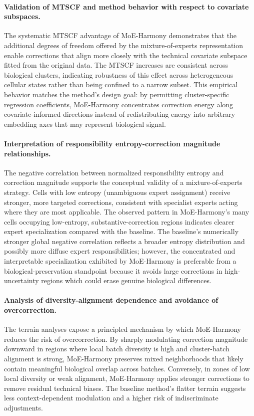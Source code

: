 \documentclass{article}
\begin{document}
\paragraph{Validation of MTSCF and method behavior with respect to covariate subspaces.} The systematic MTSCF advantage of MoE\hyp{}Harmony demonstrates that the additional degrees of freedom offered by the mixture-of-experts representation enable corrections that align more closely with the technical covariate subspace fitted from the original data. The MTSCF increases are consistent across biological clusters, indicating robustness of this effect across heterogeneous cellular states rather than being confined to a narrow subset. This empirical behavior matches the method's design goal: by permitting cluster-specific regression coefficients, MoE-Harmony concentrates correction energy along covariate-informed directions instead of redistributing energy into arbitrary embedding axes that may represent biological signal.

\paragraph{Interpretation of responsibility entropy-correction magnitude relationships.} The negative correlation between normalized responsibility entropy and correction magnitude supports the conceptual validity of a mixture-of-experts strategy. Cells with low entropy (unambiguous expert assignment) receive stronger, more targeted corrections, consistent with specialist experts acting where they are most applicable. The observed pattern in MoE-Harmony's many cells occupying low-entropy, substantive-correction regions indicates clearer expert specialization compared with the baseline. The baseline's numerically stronger global negative correlation reflects a broader entropy distribution and possibly more diffuse expert responsibilities; however, the concentrated and interpretable specialization exhibited by MoE-Harmony is preferable from a biological\hyp{}preservation standpoint because it avoids large corrections in high-uncertainty regions which could erase genuine biological differences.

\paragraph{Analysis of diversity-alignment dependence and avoidance of overcorrection.} The terrain analyses expose a principled mechanism by which MoE-Harmony reduces the risk of overcorrection. By sharply modulating correction magnitude downward in regions where local batch diversity is high and cluster-batch alignment is strong, MoE-Harmony preserves mixed neighborhoods that likely contain meaningful biological overlap across batches. Conversely, in zones of low local diversity or weak alignment, MoE-Harmony applies stronger corrections to remove residual technical biases. The baseline method's flatter terrain suggests less context-dependent modulation and a higher risk of indiscriminate adjustments.
\end{document}
